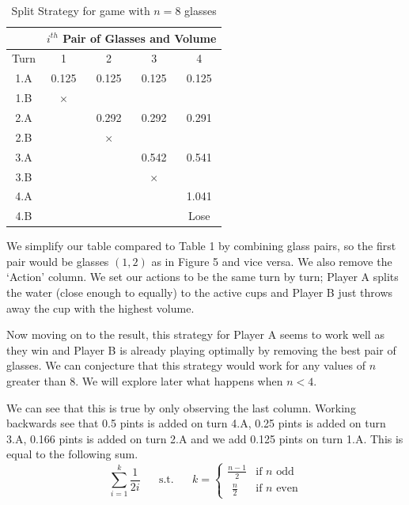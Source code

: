 \documentclass[11pt]{article}
\newcommand{\keywordfont}{\textsc}
\newcommand{\keyword}[1]{%
  \marginpar{\raggedright\small\keywordfont{#1}}}
\begin{document}
\begin{table}[h]
    \centering
    \begin{tabular}{|c|c|c|c|c|} \hline 
         &  \multicolumn{4}{|c|}{$i^{th}$ Pair of Glasses and Volume}\\ \hline 
         Turn&  1&  2&  3&  4\\ \hline 
         1.A
&  0.125&  0.125&  0.125&  0.125\\ \hline 
         1.B
&  $\times$&  &  &  \\ \hline 
         2.A
&  &  0.292&  0.292&  0.291\\ \hline 
         2.B
&  &  $\times$&  &  \\ \hline 
         3.A
&  &  &  0.542&  0.541\\ \hline 
         3.B
&  &  &  $\times$&  \\ \hline 
 4.A
& & & & 1.041\\ \hline 
 4.B
& & & & Lose\\ \hline
    \end{tabular}
    \caption{Split Strategy for game with $n=8$ glasses}
    \label{tab:my_label}
\end{table}

We simplify our table compared to Table 1 by combining glass pairs, so the first pair would be glasses $(1, 2)$ as in Figure 5 and vice versa. We also remove the `Action' column. We set our actions to be the same turn by turn; Player A splits the water (close enough to equally) to the active cups and Player B just throws away the cup with the highest volume. 

Now moving on to the result, this strategy for Player A seems to work well as they win and Player B is already playing optimally by removing the best pair of glasses. We can conjecture \keyword{Conjecture} that this strategy would work for any values of $n$ greater than 8. We will explore later what happens when $n < 4$.

We can see that this is \keyword{Justify} true by only observing the last column. Working backwards see that 0.5 pints is added on turn 4.A, 0.25 pints is added on turn 3.A, 0.166 pints is added on turn 2.A and we add 0.125 pints on turn 1.A. This is equal to the following sum.
\[
\sum^{k}_{i=1}{\frac{1}{2i}} \hspace{20pt} \text{s.t.} \hspace{20pt}  
k = \begin{cases} 
      \frac{n-1}{2} & \text{if $n$ odd}  \\
      \hspace{5pt} \frac{n}{2} & \text{if $n$ even}
   \end{cases}
\]
\end{document}
